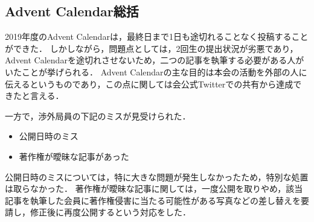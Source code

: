 \subsection*{Advent Calendar総括}


2019年度のAdvent Calendarは，最終日まで1日も途切れることなく投稿することができた．
しかしながら，問題点としては，2回生の提出状況が劣悪であり，Advent Calendarを途切れさせないため，二つの記事を執筆する必要がある人がいたことが挙げられる．
Advent Calendarの主な目的は本会の活動を外部の人に伝えるというものであり，この点に関しては会公式Twitterでの共有から達成できたと言える．

一方で，渉外局員の下記のミスが見受けられた．
\begin{itemize}
\item 公開日時のミス
\item 著作権が曖昧な記事があった
\end{itemize}
公開日時のミスについては，特に大きな問題が発生しなかったため，特別な処置は取らなかった．
著作権が曖昧な記事に関しては，一度公開を取りやめ，該当記事を執筆した会員に著作権侵害に当たる可能性がある写真などの差し替えを要請し，修正後に再度公開するという対応をした．

